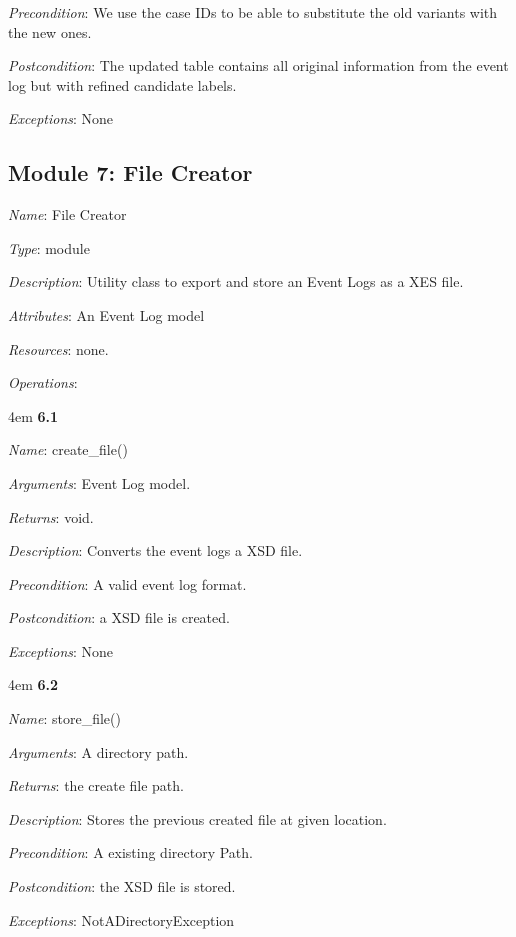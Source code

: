 \documentclass[notitlepage]{article}
\begin{document}
\begin{flushleft}
\textit{Precondition}: We use the case IDs to be able to substitute the old variants with the new ones.

\textit{Postcondition}: The updated table contains all original information from the event log but with refined candidate labels.

\textit{Exceptions}: None
\par
\endgroup




\subsection{Module 7: File Creator}
\textit{Name}: File Creator

\textit{Type}: module

\textit{Description}: Utility class to export and store an Event Logs as a XES file.

\textit{Attributes}: An Event Log model

\textit{Resources}: none.

\textit{Operations}: 
\medskip
\par
\begingroup
\leftskip4em
\textbf{6.1} 

\textit{Name}: create\_file()

\textit{Arguments}: Event Log model.

\textit{Returns}: void.

\textit{Description}: Converts the event logs a XSD file.

\textit{Precondition}: A valid event log format.

\textit{Postcondition}: a XSD file is created.

\textit{Exceptions}: None
\par
\endgroup

\medskip
\par
\begingroup
\leftskip4em
\textbf{6.2} 

\textit{Name}: store\_file()

\textit{Arguments}: A directory path.

\textit{Returns}: the create file path.

\textit{Description}: Stores the previous created file at given location.

\textit{Precondition}: A existing directory Path.

\textit{Postcondition}: the XSD file is stored.

\textit{Exceptions}: NotADirectoryException
\par
\endgroup






\end{flushleft}
\end{document}
